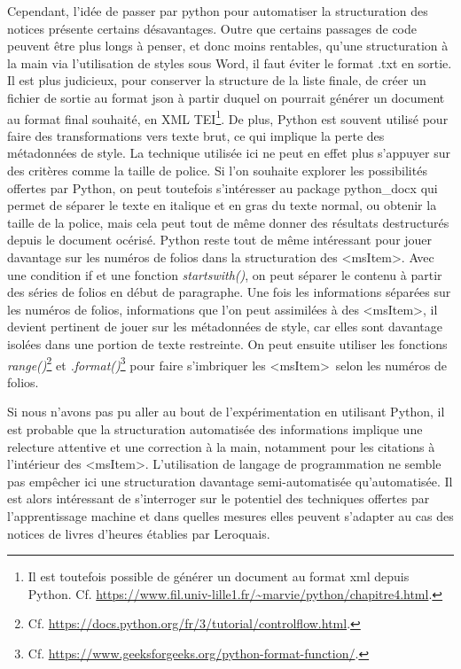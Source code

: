 \documentclass[a4paper,12pt,twoside]{book}
\begin{document}
Cependant, l'idée de passer par python pour automatiser la structuration des notices présente certains désavantages. Outre que certains passages de code peuvent être plus longs à penser, et donc moins rentables, qu'une structuration à la main via l'utilisation de styles sous Word, il faut éviter le format .txt en sortie. Il est plus judicieux, pour conserver la structure de la liste finale, de créer un fichier de sortie au format json à partir duquel on pourrait générer un document au format final souhaité, en XML TEI\footnote{Il est toutefois possible de générer un document au format xml depuis Python. Cf. \url{https://www.fil.univ-lille1.fr/~marvie/python/chapitre4.html}.}. De plus, Python est souvent utilisé pour faire des transformations vers texte brut, ce qui implique la perte des métadonnées de style. La technique utilisée ici ne peut en effet plus s'appuyer sur des critères comme la taille de police. Si l'on souhaite explorer les possibilités offertes par Python, on peut toutefois s'intéresser au package python\_docx qui permet de séparer le texte en italique et en gras du texte normal, ou obtenir la taille de la police, mais cela peut tout de même donner des résultats destructurés depuis le document océrisé. 
Python reste tout de même intéressant pour jouer davantage sur les numéros de folios dans la structuration des \textless msItem\textgreater . Avec une condition \og if\fg{} et une fonction \textit{startswith()}, on peut séparer le contenu à partir des séries de folios en début de paragraphe. Une fois les informations séparées sur les numéros de folios, informations que l'on peut assimilées à des \textless msItem\textgreater , il devient pertinent de jouer sur les métadonnées de style, car elles sont davantage isolées dans une portion de texte restreinte. On peut ensuite utiliser les fonctions \textit{range()}\footnote{Cf. \url{https://docs.python.org/fr/3/tutorial/controlflow.html}.} et \textit{.format()}\footnote{Cf. \url{https://www.geeksforgeeks.org/python-format-function/}.} pour faire s'imbriquer les \textless msItem\textgreater~selon les numéros de folios. 

Si nous n'avons pas pu aller au bout de l'expérimentation en utilisant Python, il est probable que la structuration automatisée des informations implique une relecture attentive et une correction à la main, notamment pour les citations à l'intérieur des \textless msItem\textgreater . L'utilisation de langage de programmation ne semble pas empêcher ici une structuration davantage semi-automatisée qu'automatisée. Il est alors intéressant de s'interroger sur le potentiel des techniques offertes par l'apprentissage machine et dans quelles mesures elles peuvent s'adapter au cas des notices de livres d'heures établies par Leroquais. 
	
\end{document}
